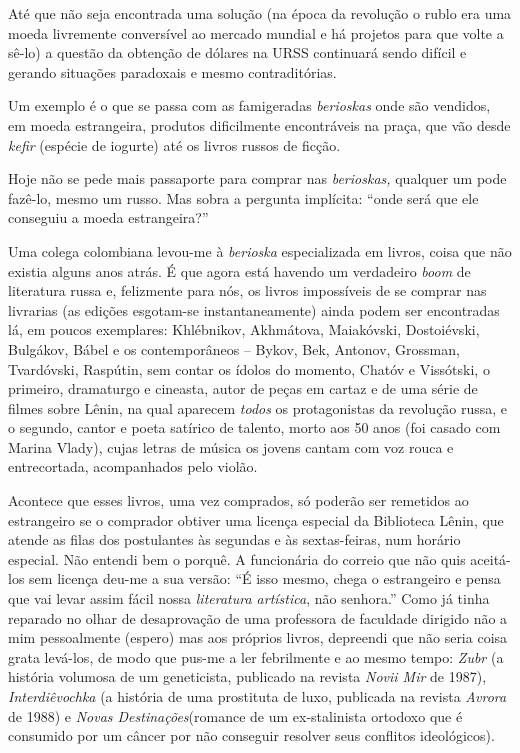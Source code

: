 Até que não seja encontrada uma solução (na época da revolução o rublo
era uma moeda livremente conversível ao mercado mundial e há projetos
para que volte a sê-lo) a questão da obtenção de dólares na URSS
continuará sendo difícil e gerando situações paradoxais e mesmo
contraditórias.

Um exemplo é o que se passa com as famigeradas \emph{berioskas} onde são
vendidos, em moeda estrangeira, produtos dificilmente encontráveis na
praça, que vão desde \emph{kefir} (espécie de iogurte) até os livros
russos de ficção.

Hoje não se pede mais passaporte para comprar nas \emph{berioskas,}
qualquer um pode fazê-lo, mesmo um russo. Mas sobra a pergunta
implícita: ``onde será que ele conseguiu a moeda estrangeira?''

Uma colega colombiana levou-me à \emph{berioska} especializada em
livros, coisa que não existia alguns anos atrás. É que agora está
havendo um verdadeiro \emph{boom} de literatura russa e, felizmente para
nós, os livros impossíveis de se comprar nas livrarias (as edições
esgotam-se instantaneamente) ainda podem ser encontradas lá, em poucos
exemplares: Khlébnikov, Akhmátova, Maiakóvski, Dostoiévski, Bulgákov,
Bábel e os contemporâneos -- Bykov, Bek, Antonov, Grossman, Tvardóvski,
Raspútin, sem contar os ídolos do momento, Chatóv e Vissótski, o
primeiro, dramaturgo e cineasta, autor de peças em cartaz e de uma série
de filmes sobre Lênin, na qual aparecem \emph{todos} os protagonistas da
revolução russa, e o segundo, cantor e poeta satírico de talento, morto
aos 50 anos (foi casado com Marina Vlady), cujas letras de música os
jovens cantam com voz rouca e entrecortada, acompanhados pelo violão.

Acontece que esses livros, uma vez comprados, só poderão ser remetidos
ao estrangeiro se o comprador obtiver uma licença especial da Biblioteca
Lênin, que atende as filas dos postulantes às segundas e às
sextas-feiras, num horário especial. Não entendi bem o porquê. A
funcionária do correio que não quis aceitá-los sem licença deu-me a sua
versão: ``É isso mesmo, chega o estrangeiro e pensa que vai levar assim
fácil nossa \emph{literatura artística}, não senhora.'' Como já tinha
reparado no olhar de desaprovação de uma professora de faculdade
dirigido não a mim pessoalmente (espero) mas aos próprios livros,
depreendi que não seria coisa grata levá-los, de modo que pus-me a ler
febrilmente e ao mesmo tempo: \emph{Zubr} (a história volumosa de um
geneticista, publicado na revista \emph{Novii Mir} de 1987),
\emph{Interdiêvochka} (a história de uma prostituta de luxo, publicada
na revista \emph{Avrora} de 1988) e \emph{Novas Destinações}(romance de
um ex-stalinista ortodoxo que é consumido por um câncer por não
conseguir resolver seus conflitos ideológicos).

